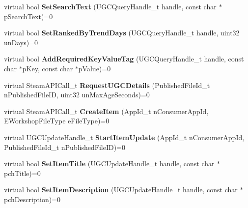 \begin{DoxyCompactItemize}
\mbox{\label{class_i_steam_u_g_c_a199a70a52fdec017d9a4eed2cc692c11}} 
virtual bool {\bfseries Set\+Search\+Text} (U\+G\+C\+Query\+Handle\+\_\+t handle, const char $\ast$p\+Search\+Text)=0
\item 
\mbox{\label{class_i_steam_u_g_c_a63ed9c33d52cfb5c837d2194c0b16906}} 
virtual bool {\bfseries Set\+Ranked\+By\+Trend\+Days} (U\+G\+C\+Query\+Handle\+\_\+t handle, uint32 un\+Days)=0
\item 
\mbox{\label{class_i_steam_u_g_c_a098d945a167df04b1d718022931da4ab}} 
virtual bool {\bfseries Add\+Required\+Key\+Value\+Tag} (U\+G\+C\+Query\+Handle\+\_\+t handle, const char $\ast$p\+Key, const char $\ast$p\+Value)=0
\item 
\mbox{\label{class_i_steam_u_g_c_a698c7277cc2467648d014843de80ccd3}} 
virtual Steam\+A\+P\+I\+Call\+\_\+t {\bfseries Request\+U\+G\+C\+Details} (Published\+File\+Id\+\_\+t n\+Published\+File\+ID, uint32 un\+Max\+Age\+Seconds)=0
\item 
\mbox{\label{class_i_steam_u_g_c_a501c538bdc46dc9a4c3ce164b4ddba1a}} 
virtual Steam\+A\+P\+I\+Call\+\_\+t {\bfseries Create\+Item} (App\+Id\+\_\+t n\+Consumer\+App\+Id, E\+Workshop\+File\+Type e\+File\+Type)=0
\item 
\mbox{\label{class_i_steam_u_g_c_af7efa15bc718952a9074331781bebbf4}} 
virtual U\+G\+C\+Update\+Handle\+\_\+t {\bfseries Start\+Item\+Update} (App\+Id\+\_\+t n\+Consumer\+App\+Id, Published\+File\+Id\+\_\+t n\+Published\+File\+ID)=0
\item 
\mbox{\label{class_i_steam_u_g_c_ac20d93253d30f8e637d9fa822ce16a01}} 
virtual bool {\bfseries Set\+Item\+Title} (U\+G\+C\+Update\+Handle\+\_\+t handle, const char $\ast$pch\+Title)=0
\item 
\mbox{\label{class_i_steam_u_g_c_a840f9a6a2406dee5e845629f15f21d90}} 
virtual bool {\bfseries Set\+Item\+Description} (U\+G\+C\+Update\+Handle\+\_\+t handle, const char $\ast$pch\+Description)=0
\item 
\mbox{\label{class_i_steam_u_g_c_ab0b8ecba7aa766f44fd613eb23b40a01}} 

\end{DoxyCompactItemize}
